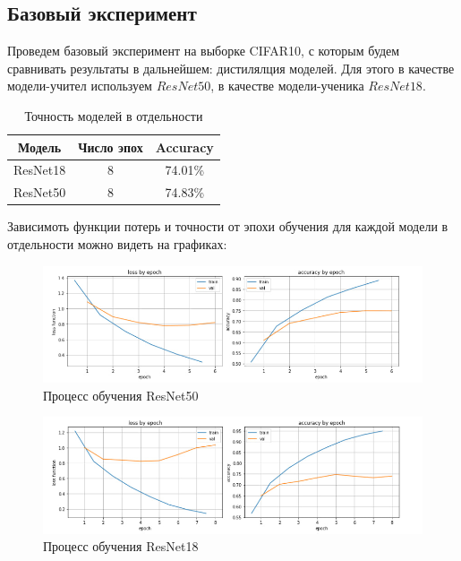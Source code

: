\documentclass[12pt]{article}
\begin{document}
\subsection{Базовый эксперимент}

Проведем базовый эксперимент на выборке CIFAR10, с которым будем сравнивать результаты в дальнейшем: дистилялция моделей. Для этого в качестве модели-учител используем $ResNet50$, в качестве модели-ученика $ResNet18$. 

\begin{table}[htbp]
  \centering
  \begin{tabular}{|c|c|c|}
    \hline
    Модель & Число эпох & Accuracy \\ \hline
    ResNet18 & 8 & 74.01\% \\ \hline
    ResNet50 & 8 & 74.83\% \\ \hline
  \end{tabular}
  \caption{Точность моделей в отдельности}
  \label{tab:my-table}
\end{table}

Зависимоть функции потерь и точности от эпохи обучения для каждой модели в отдельности можно видеть на графиках:

\begin{figure}[h]
\centering
\includegraphics[width=1\textwidth]{resnet50lrcurve.jpg}
\caption{Процесс обучения ResNet50}
\label{fig:имя_файла}
\end{figure}

\begin{figure}[h]
\centering
\includegraphics[width=1\textwidth]{resnet18lrcurve.jpg}
\caption{Процесс обучения ResNet18}
\label{fig:имя_файла}
\end{figure}
\end{document}

